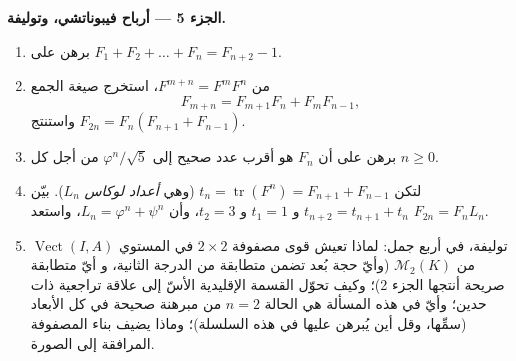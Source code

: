 \begin{problem}
\medskip
\noindent\textbf{الجزء 5 --- أرباح فيبوناتشي، وتوليفة.}
\begin{enumerate}[resume]
  \item برهن على $F_1 + F_2 + \dots + F_n = F_{n+2} - 1$.
  \item من $F^{m+n} = F^m F^n$، استخرج صيغة الجمع
        \[
        F_{m+n} = F_{m+1}F_n + F_m F_{n-1},
        \]
        واستنتج $F_{2n} = F_n(F_{n+1} + F_{n-1})$.
  \item برهن على أن $F_n$ هو أقرب عدد صحيح إلى
        $\varphi^n/\sqrt5$ من أجل كل $n \geq 0$.
  \item لتكن $t_n = \operatorname{tr}(F^n) = F_{n+1} + F_{n-1}$
        (وهي \emph{أعداد لوكاس} $L_n$). بيّن $t_{n+2} =
        t_{n+1} + t_n$ و $t_1 = 1$ و $t_2 = 3$، وأن $L_n =
        \varphi^n + \psi^n$، واستعد $F_{2n} = F_n L_n$.
  \item توليفة، في أربع جمل: لماذا تعيش قوى مصفوفة $2
        \times 2$ في المستوي
        $\operatorname{Vect}(I, A)$ من $\mathcal{M}_2(K)$ (وأيّ
        حجة بُعد تضمن متطابقة من الدرجة الثانية، و
        أيّ متطابقة صريحة أنتجها الجزء 2)؛ وكيف تحوّل القسمة
        الإقليدية الأسّ إلى علاقة تراجعية ذات
        حدين؛ وأيّ  في هذه المسألة هي الحالة $n =
        2$ من مبرهنة صحيحة في كل الأبعاد (سمِّها،
        وقل أين يُبرهن عليها في هذه السلسلة)؛ وماذا
        يضيف بناء المصفوفة المرافقة إلى الصورة.
\end{enumerate}
\end{problem}

